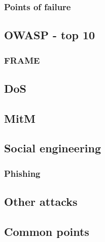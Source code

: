 \subsubsection{Points of failure}

\subsection{OWASP - top 10}

\begin{frame}
\frametitle{FRAME}
\end{frame}

\subsection{DoS}

\subsection{MitM}

\subsection{Social engineering}

\subsubsection{Phishing}

\subsection{Other attacks}

\subsection{Common points}
